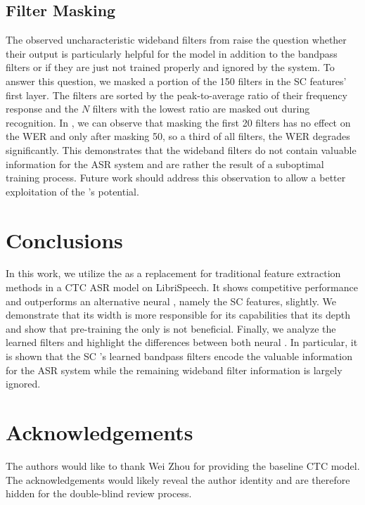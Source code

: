 \documentclass{INTERSPEECH2023}
\begin{document}
\subsection{Filter Masking}

The observed uncharacteristic wideband filters from  raise the question whether their output is particularly helpful for the model in addition to the bandpass filters or if they are just not trained properly and ignored by the system.
To answer this question, we masked a portion of the 150 filters in the \gls{SC} features' first layer.
The filters are sorted by the peak-to-average ratio of their frequency response and the $N$ filters with the lowest ratio are masked out during recognition.
In , we can observe that masking the first 20 filters has no effect on the \gls{WER} and only after masking 50, so a third of all filters, the \gls{WER} degrades significantly.
This demonstrates that the wideband filters do not contain valuable information for the \gls{ASR} system and are rather the result of a suboptimal training process.
Future work should address this observation to allow a better exploitation of the \fe's potential.

\section{Conclusions}
In this work, we utilize the \wvtwo \fe as a replacement for traditional feature extraction methods in a \gls{CTC} \gls{ASR} model on LibriSpeech.
It shows competitive performance and outperforms an alternative neural \fe, namely the \gls{SC} features, slightly.
We demonstrate that its width is more responsible for its capabilities that its depth and show that pre-training the \fe only is not beneficial.
Finally, we analyze the learned filters and highlight the differences between both neural \fes.
In particular, it is shown that the \gls{SC} \fe's learned bandpass filters encode the valuable information for the \gls{ASR} system while the remaining wideband filter information is largely ignored.

\section{Acknowledgements}
\ifinterspeechfinal
     The authors would like to thank Wei Zhou for providing the baseline \gls{CTC} model.
\else
     The acknowledgements would likely reveal the author identity and are therefore hidden for the double-blind review process.
\fi



\end{document}
